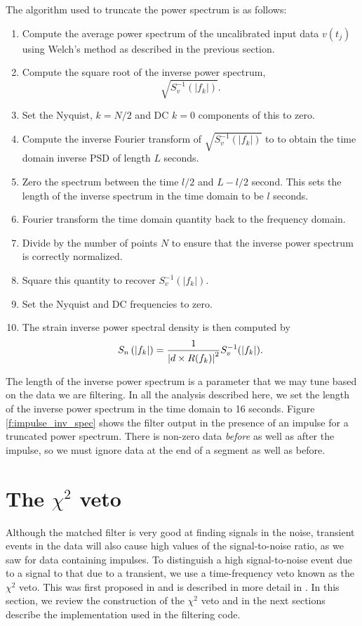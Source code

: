 The algorithm used to truncate the power spectrum is as follows:
\begin{enumerate}
\item Compute the average power spectrum of the uncalibrated input data
$v(t_j)$ using Welch's method as described in the previous section.
\item Compute the square root of the inverse power spectrum,
\begin{equation}
\sqrt{S^{-1}_v(|f_k|)}.
\end{equation}
\item Set the Nyquist, $k = N/2$ and DC $k = 0$ components of this to zero.
\item Compute the inverse Fourier transform of $\sqrt{S^{-1}_v(|f_k|)}$ to to
obtain the time domain inverse PSD of length $L$ seconds.
\item Zero the spectrum between the time $l/2$ and $L-l/2$ second. This sets
the length of the inverse spectrum in the time domain to be $l$ seconds.
\item Fourier transform the time domain quantity back to the frequency domain.
\item Divide by the number of points $N$ to ensure that the inverse power
spectrum is correctly normalized.
\item Square this quantity to recover $S^{-1}_v(|f_k|)$.
\item Set the Nyquist and DC frequencies to zero.
\item The strain inverse power spectral density is then computed by
\begin{equation}
S_n\left(\left|f_{k}\right|\right) = \frac{1}{\left|d \times R(f_k)\right|^2} S^{-1}_v(|f_k|).
\end{equation}
\end{enumerate}
The length of the inverse power spectrum is a parameter that we may tune based
on the data we are filtering. In all the analysis described here, we set the
length of the inverse power spectrum in the time domain to 16 seconds.
Figure \ref{f:impulse_inv_spec} shows the filter output in the presence of an
impulse for a truncated power spectrum. There is non-zero data \emph{before}
as well as after the impulse, so we must ignore data at the end of a segment
as well as before.

\section{The $\chi^2$ veto}
\label{s:chisqcts}

Although the matched filter is very good at finding signals in the noise,
transient events in the data will also cause high values of the
signal-to-noise ratio, as we saw for data containing impulses. To distinguish
a high signal-to-noise event due to a signal to that due to a transient, we
use a time-frequency veto known as the $\chi^2$ veto. This was first proposed
in \cite{grasp} and is described in more detail in \cite{brucechisqpaper}.
In this section, we review the construction of the $\chi^2$ veto and in the
next sections describe the implementation used in the filtering code.


